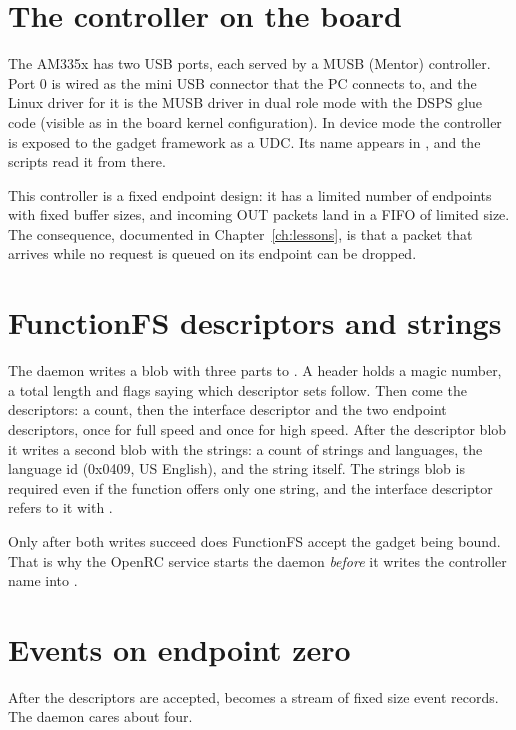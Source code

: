\section{The controller on the board}

The AM335x has two USB ports, each served by a MUSB (Mentor) controller. Port 0 is wired as the mini USB connector that the PC connects to, and the Linux driver for it is the MUSB driver in dual role mode with the DSPS glue code (visible as  in the board kernel configuration). In device mode the controller is exposed to the gadget framework as a UDC. Its name appears in , and the scripts read it from there.

This controller is a fixed endpoint design: it has a limited number of endpoints with fixed buffer sizes, and incoming OUT packets land in a FIFO of limited size. The consequence, documented in Chapter~\ref{ch:lessons}, is that a packet that arrives while no request is queued on its endpoint can be dropped.

\section{FunctionFS descriptors and strings}

The daemon writes a blob with three parts to . A header holds a magic number, a total length and flags saying which descriptor sets follow. Then come the descriptors: a count, then the interface descriptor and the two endpoint descriptors, once for full speed and once for high speed. After the descriptor blob it writes a second blob with the strings: a count of strings and languages, the language id (0x0409, US English), and the string itself. The strings blob is required even if the function offers only one string, and the interface descriptor refers to it with .

Only after both writes succeed does FunctionFS accept the gadget being bound. That is why the OpenRC service starts the daemon \emph{before} it writes the controller name into .

\section{Events on endpoint zero}

After the descriptors are accepted,  becomes a stream of fixed size event records. The daemon cares about four.

